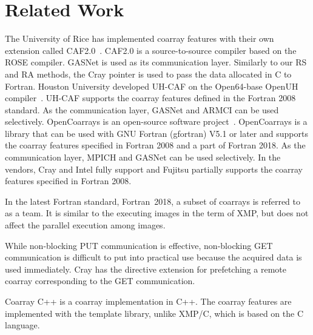﻿\section{Related Work}\label{sec:related}

The University of Rice has implemented coarray features with their own extension 
called CAF2.0~\cite{Rice}.
CAF2.0 is a source-to-source compiler based on the ROSE compiler. GASNet is used as its 
communication layer.
Similarly to our RS and RA methods, the Cray pointer is used to pass the data 
allocated in C to Fortran.
%
Houston University developed UH-CAF on the Open64-base OpenUH compiler~\cite{HU}. 
UH-CAF supports the coarray features defined in the Fortran 2008 standard. As the communication 
layer, GASNet and ARMCI can be used selectively.
%
OpenCoarrays is an open-source software project~\cite{OpenCo}. OpenCoarrays is a library 
that can be used with GNU Fortran (gfortran) V5.1 or later and supports the coarray features
specified in Fortran 2008 and a part of Fortran 2018. As the communication layer,
MPICH and GASNet can be used selectively.
%
In the vendors, Cray and Intel fully support and Fujitsu partially supports the coarray features
specified in Fortran 2008.

In the latest Fortran standard, Fortran~2018, a subset of coarrays is referred to as a team.
It is similar to the executing images in the term of XMP, but does not affect
the parallel execution among images.

While non-blocking PUT communication is effective, non-blocking GET communication
is difficult to put into practical use because the acquired data is used immediately.
Cray has the directive extension for prefetching a remote coarray corresponding to 
the GET communication.

Coarray C++ is a coarray implementation in C++. The coarray features are implemented
with the template library, unlike XMP/C, which is based on the C language.




